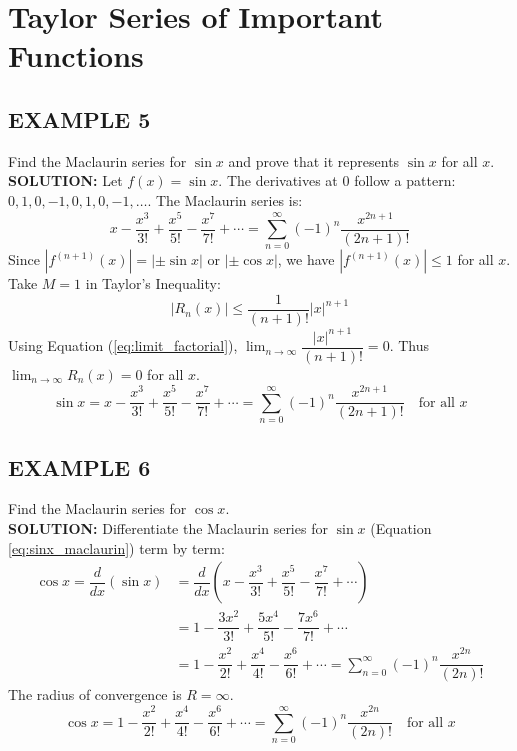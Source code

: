 \documentclass{article}
\theoremstyle{mystyle}
\begin{document}
\section*{Taylor Series of Important Functions}

\subsection*{EXAMPLE 5}
Find the Maclaurin series for \(\sin x\) and prove that it represents \(\sin x\) for all \(x\).\\
\textbf{SOLUTION:}
Let \(f(x) = \sin x\). The derivatives at 0 follow a pattern: \(0, 1, 0, -1, 0, 1, 0, -1, \ldots\).
The Maclaurin series is:
\[ x - \dfrac{x^3}{3!} + \dfrac{x^5}{5!} - \dfrac{x^7}{7!} + \cdots = \sum_{n=0}^{\infty} (-1)^n \dfrac{x^{2n+1}}{(2n+1)!} \]
Since \(|f^{(n+1)}(x)| = |\pm \sin x|\) or \(|\pm \cos x|\), we have \(|f^{(n+1)}(x)| \le 1\) for all \(x\). Take \(M=1\) in Taylor's Inequality:
\[ |R_n(x)| \le \dfrac{1}{(n+1)!} |x|^{n+1} \]
Using Equation (\ref{eq:limit_factorial}), \(\lim_{n\to\infty} \dfrac{|x|^{n+1}}{(n+1)!} = 0\). Thus \(\lim_{n\to\infty} R_n(x) = 0\) for all \(x\).
\begin{equation}
 \sin x = x - \dfrac{x^3}{3!} + \dfrac{x^5}{5!} - \dfrac{x^7}{7!} + \cdots = \sum_{n=0}^{\infty} (-1)^n \dfrac{x^{2n+1}}{(2n+1)!} \quad \text{for all } x \label{eq:sinx_maclaurin}
\end{equation}

\subsection*{EXAMPLE 6}
Find the Maclaurin series for \(\cos x\).\\
\textbf{SOLUTION:}
Differentiate the Maclaurin series for \(\sin x\) (Equation \ref{eq:sinx_maclaurin}) term by term:
\begin{align*}
 \cos x = \dfrac{d}{dx}(\sin x) &= \dfrac{d}{dx} \left( x - \dfrac{x^3}{3!} + \dfrac{x^5}{5!} - \dfrac{x^7}{7!} + \cdots \right) \\
 &= 1 - \dfrac{3x^2}{3!} + \dfrac{5x^4}{5!} - \dfrac{7x^6}{7!} + \cdots \\
 &= 1 - \dfrac{x^2}{2!} + \dfrac{x^4}{4!} - \dfrac{x^6}{6!} + \cdots = \sum_{n=0}^{\infty} (-1)^n \dfrac{x^{2n}}{(2n)!}
\end{align*}
The radius of convergence is \(R = \infty\).
\begin{equation}
 \cos x = 1 - \dfrac{x^2}{2!} + \dfrac{x^4}{4!} - \dfrac{x^6}{6!} + \cdots = \sum_{n=0}^{\infty} (-1)^n \dfrac{x^{2n}}{(2n)!} \quad \text{for all } x \label{eq:cosx_maclaurin}
\end{equation}
\end{document}

